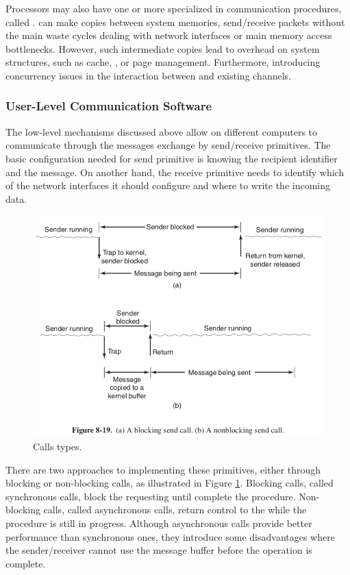 				Processors may also have one or more \cpus specialized in
				communication procedures, called \dma.
				\dmas can make copies between system memories, send/receive packets
				without the main \cpus waste cycles dealing with network interfaces
				or main memory access bottlenecks.
				However, such intermediate copies lead to overhead on system structures,
				such as cache, \tlb, or page management.
				Furthermore, introducing concurrency issues in the interaction between
				\cpus and existing \dma channels.

			\subsubsection{User-Level Communication Software}
			\label{sec.multicomputers-user-sw}

				The low-level mechanisms discussed above allow \cpus on different
				computers to communicate through the messages exchange by
				send/receive primitives.
				The basic configuration needed for send primitive is knowing the
				recipient identifier and the message.
				On another hand, the receive primitive needs to identify which of
				the network interfaces it should configure and where to write the
				incoming data.

				\begin{figure}[h]
					\centering
					\includegraphics[width=.8\textwidth]{images/calls-types.png}

					\caption{
						Calls types.
					}\par
					\label{fig.calls-types}
				\end{figure}

				There are two approaches to implementing these primitives, either
				through blocking or non-blocking calls, as illustrated in Figure \ref{fig.calls-types}.
				Blocking calls, called synchronous calls, block the requesting \cpu
				until complete the procedure.
				Non-blocking calls, called asynchronous calls, return control to the
				\cpu while the procedure is still in progress.
				Although asynchronous calls provide better performance than
				synchronous ones, they introduce some disadvantages where the sender/receiver
				cannot use the message buffer before the operation is complete.

